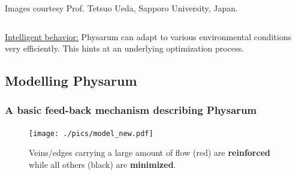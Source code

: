 \documentclass[	hyperref={pdfpagelabels=false}, xcolor=dvipsnames,
		11pt]{beamer}
\begin{document}
\begin{frame}
\begin{columns}
\begin{column}{5cm}
\begin{overprint}
{\begin{minipage}{5 cm}
\begin{center}
	\tiny{Images courtesy Prof. Tetsuo Ueda, Sapporo University, Japan.}
	

      \end{center}
     \end{minipage} }






\end{overprint}
\end{column}
\end{columns}

\vspace{-1cm}

\centering
	\begin{alertblock}{\underline{Intelligent behavior:}}
	  Physarum can adapt to various environmental conditions very efficiently. This hints at an underlying optimization process.
	\end{alertblock}



\end{frame}



\subsection{Modelling Physarum}

\begin{frame}
       \frametitle{A basic feed-back mechanism describing Physarum} 
   
       \begin{figure}
        
      

	    \texttt{[image: ./pics/model\_new.pdf]}
	 
	    \vspace{1cm}
	    
      \begin{center}
      \caption{Veins/edges carrying a large amount of flow (red) are \alert{{\bf reinforced}} while all others (black) are 
	      \textcolor{arrowblue}{{\bf minimized}}.}
      \end{center}

      \end{figure}


\end{frame}


\end{document}
